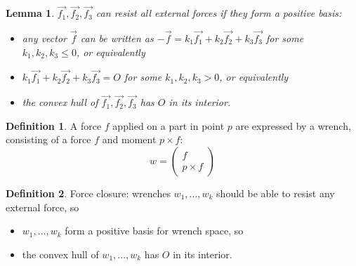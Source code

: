 \documentclass{article}
\newtheorem{lemma}{Lemma}[section]
\theoremstyle{definition}
\newtheorem{definition}{Definition}[section]
\begin{document}
\begin{lemma}
$\vec{f_1}, \vec{f_2}, \vec{f_3}$ can resist all external forces if they form a positive basis:
\begin{itemize}
\item any vector $\vec{f}$ can be written as $-\vec{f} = k_1\vec{f_1} + k_2\vec{f_2} + k_3\vec{f_3}$ for some $k_1, k_2, k_3 \leq 0$, or equivalently
\item $k_1\vec{f_1} + k_2\vec{f_2} + k_3\vec{f_3} = O$ for some $k_1, k_2, k_3 > 0$, or equivalently
\item the convex hull of $\vec{f_1}, \vec{f_2}, \vec{f_3}$ has $O$ in its interior.
\end{itemize}
\end{lemma}

\begin{definition}
A force $f$ applied on a part in point $p$ are expressed by a wrench, consisting of a force $f$ and moment $p \times f$: \[ w = \begin{pmatrix}f\\p \times f\end{pmatrix} \]
\end{definition}

\begin{definition}
Force closure: wrenches $w_1, ..., w_k$ should be able to resist any external force, so
\begin{itemize}
\item $w_1, ..., w_k$ form a positive basis for wrench space, so
\item the convex hull of $w_1, ..., w_k$ has $O$ in its interior.
\end{itemize}
\end{definition}
\end{document}
